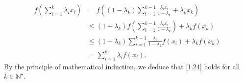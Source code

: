 \documentclass[a4paper]{article}
\numberwithin{equation}{section}
\begin{document}
\begin{align}
f\left( {\sum\limits_{i = 1}^k {{\lambda _i}{x_i}} } \right) &= f\left( {\left( {1 - {\lambda _k}} \right)\sum\limits_{i = 1}^{k - 1} {\frac{{{\lambda _i}{x_i}}}{{1 - {\lambda _k}}}}  + {\lambda _k}{x_k}} \right)\\
& \le \left( {1 - {\lambda _k}} \right)f\left( {\sum\limits_{i = 1}^{k - 1} {\frac{{{\lambda _i}{x_i}}}{{1 - {\lambda _k}}}} } \right) + {\lambda _k}f\left( {{x_k}} \right)\\
& \le \left( {1 - {\lambda _k}} \right)\sum\limits_{i = 1}^{k - 1} {\frac{{{\lambda _i}}}{{1 - {\lambda _k}}}f\left( {{x_i}} \right)}  + {\lambda _k}f\left( {{x_k}} \right)\\
& = \sum\limits_{i = 1}^k {{\lambda _i}f\left( {{x_i}} \right)} .
\end{align}
By the principle of mathematical induction, we deduce that \eqref{1.24} holds for all $k\in \mathbb{N}^\star$. 
\end{document}
